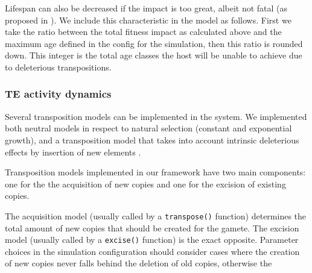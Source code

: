 \documentclass[10pt]{article}
\begin{document}
Lifespan can also be decreased if the impact is too great, albeit not
fatal (as proposed in \cite{rouzic2005}). We include this
characteristic in the model as follows. First we take the ratio
between the total fitness impact as calculated above and the maximum
age defined in the config for the simulation, then this ratio is
rounded down. This integer is the total age classes the host will be
unable to achieve due to deleterious transpositions.



\subsubsection{TE activity dynamics}

Several transposition models can be implemented in the system. We
implemented both neutral models in respect to natural selection
(constant and exponential growth), and a transposition model that
takes into account intrinsic deleterious effects by insertion of new
elements \cite{SKR05}.

Transposition models implemented in our framework have two main
components: one for the the acquisition of new copies and one for the
excision of existing copies.

The acquisition model (usually called by a \verb|transpose()|
function) determines the total amount of new copies that should be
created for the gamete. The excision model (usually called by a
\verb|excise()| function) is the exact opposite. Parameter choices in
the simulation configuration should consider cases where the creation
of new copies never falls behind the deletion of old copies, otherwise
the 



\end{document}
